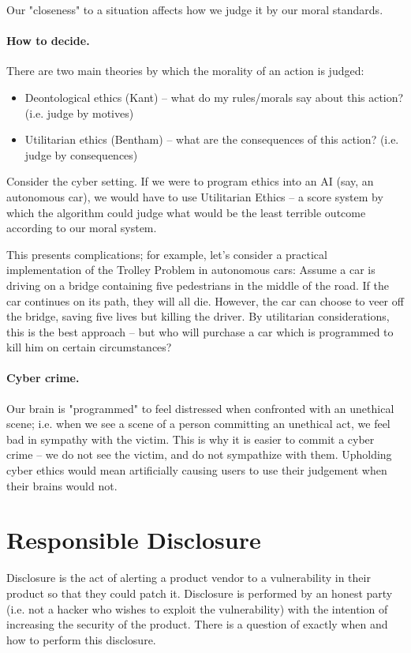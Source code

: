 Our "closeness" to a situation affects how we judge it by our moral standards.


\paragraph{How to decide.} There are two main theories by which the morality of an action is judged:
\begin{itemize}
    \item Deontological ethics (Kant) -- what do my rules/morals say about this action? (i.e. judge by motives)
    \item Utilitarian ethics (Bentham) -- what are the consequences of this action? (i.e. judge by consequences)
\end{itemize}


Consider the cyber setting. If we were to program ethics into an AI (say, an autonomous car), we would have to use Utilitarian Ethics -- a score system by which the algorithm could judge what would be the least terrible outcome according to our moral system.


This presents complications; for example, let’s consider a practical implementation of the Trolley Problem in autonomous cars:
Assume a car is driving on a bridge containing five pedestrians in the middle of the road. If the car continues on its path, they will all die. However, the car can choose to veer off the bridge, saving five lives but killing the driver. By utilitarian considerations, this is the best approach – but who will purchase a car which is programmed to kill him on certain circumstances?


\paragraph{Cyber crime.} Our brain is "programmed" to feel distressed when confronted with an unethical scene; i.e. when we see a scene of a person committing an unethical act, we feel bad in sympathy with the victim. This is why it is easier to commit a cyber crime -- we do not see the victim, and do not sympathize with them. Upholding cyber ethics would mean artificially causing users to use their judgement when their brains would not.


\section{Responsible Disclosure}
Disclosure is the act of alerting a product vendor to a vulnerability in their product so that they could patch it. Disclosure is performed by an honest party (i.e. not a hacker who wishes to exploit the vulnerability) with the intention of increasing the security of the product. There is a question of exactly when and how to perform this disclosure.



